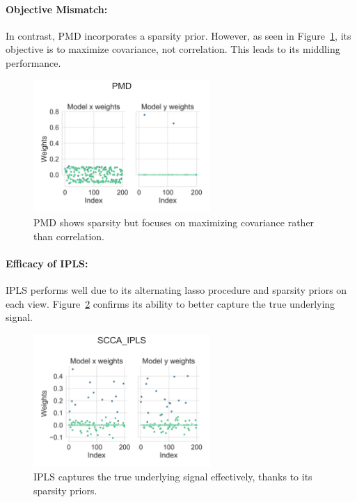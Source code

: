 \paragraph{Objective Mismatch:}
In contrast, PMD incorporates a sparsity prior. However, as seen in Figure~\ref{fig:PMD_weights}, its objective is to maximize covariance, not correlation. This leads to its middling performance.

\begin{figure}[h]
    \centering
    \includegraphics[width=0.6\textwidth]{figures/als/simulated/PMD_weights.svg}
    \caption{PMD shows sparsity but focuses on maximizing covariance rather than correlation.}
    \label{fig:PMD_weights}
\end{figure}

\paragraph{Efficacy of IPLS:}
IPLS performs well due to its alternating lasso procedure and sparsity priors on each view. Figure~\ref{fig:IPLS_weights} confirms its ability to better capture the true underlying signal.

\begin{figure}[h]
    \centering
    \includegraphics[width=0.6\textwidth]{figures/als/simulated/SCCA_IPLS_weights.svg}
    \caption{IPLS captures the true underlying signal effectively, thanks to its sparsity priors.}
    \label{fig:IPLS_weights}
\end{figure}

